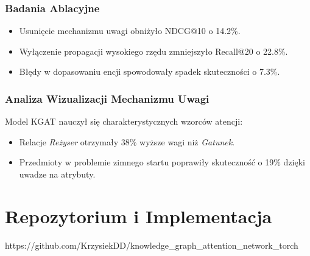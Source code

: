 \documentclass[a4paper,onecolumn]{LTJournalArticle}
\begin{document}
\subsubsection{Badania Ablacyjne}
\begin{itemize}
    \item Usunięcie mechanizmu uwagi obniżyło NDCG@10 o 14.2\%.
    \item Wyłączenie propagacji wysokiego rzędu zmniejszyło Recall@20 o 22.8\%.
    \item Błędy w dopasowaniu encji spowodowały spadek skuteczności o 7.3\%.
\end{itemize}

\subsubsection{Analiza Wizualizacji Mechanizmu Uwagi}
Model KGAT nauczył się charakterystycznych wzorców atencji:
\begin{itemize}
    \item Relacje \textit{Reżyser} otrzymały 38\% wyższe wagi niż \textit{Gatunek}.
    \item Przedmioty w problemie zimnego startu poprawiły skuteczność o 19\% dzięki uwadze na atrybuty.
\end{itemize}

\section{Repozytorium i Implementacja}
https://github.com/KrzysiekDD/knowledge_graph_attention_network_torch
	


	
	\printbibliography %
	
	
\end{document}
